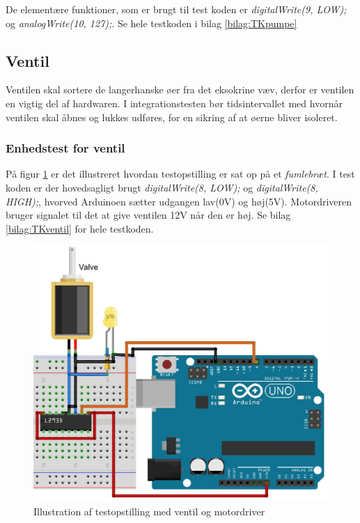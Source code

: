 De elementære funktioner, som er brugt til test koden er \textit{digitalWrite(9, LOW);} og \textit{analogWrite(10, 127);}. Se hele testkoden i bilag \ref{bilag:TKpumpe}

\newpage

 \subsection{Ventil}
Ventilen skal sortere de langerhanske øer fra det eksokrine væv, derfor er ventilen en vigtig del af hardwaren. I integrationstesten bør tidsintervallet med hvornår ventilen skal åbnes og lukkes udføres, for en sikring af at øerne bliver isoleret.
\subsubsection{Enhedstest for ventil}
På figur \ref{fig:ventilbreadboard} er det illustreret hvordan testopstilling er sat op på et \textit{fumlebræt}. I test koden er der hovedsagligt brugt \textit{digitalWrite(8, LOW);} og \textit{digitalWrite(8, HIGH);}, hvorved Arduinoen sætter udgangen lav(0V) og høj(5V). Motordriveren bruger signalet til det at give ventilen 12V når den er høj. Se bilag \ref{bilag:TKventil} for hele testkoden.

\begin{figure}[H]
	\centering
	\includegraphics[width=1\textwidth]{billeder/Hardware/diagrammer/Ventilbreadboard.JPG}
	\caption{Illustration af testopstilling med ventil og motordriver}
	\label{fig:ventilbreadboard}
\end{figure} 
 
